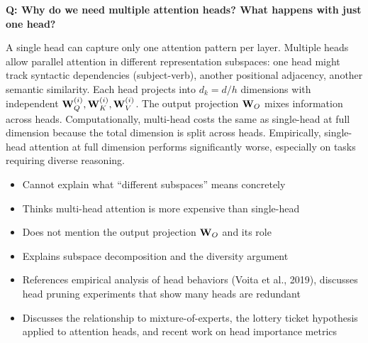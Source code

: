 \begin{interviewq}
\textbf{Q: Why do we need multiple attention heads? What happens with just one head?}

 \quad {} \quad \badgefreq{\freqhigh}

\stronganswer
A single head can capture only one attention pattern per layer.  Multiple heads
allow parallel attention in different representation subspaces: one head might
track syntactic dependencies (subject-verb), another positional adjacency,
another semantic similarity.  Each head projects into $d_k = d/h$ dimensions
with independent $\mathbf{W}_Q^{(i)}, \mathbf{W}_K^{(i)}, \mathbf{W}_V^{(i)}$.  The output
projection $\mathbf{W}_O$ mixes information across heads.  Computationally, multi-head
costs the same as single-head at full dimension because the total dimension is
split across heads.  Empirically, single-head attention at full dimension
performs significantly worse, especially on tasks requiring diverse reasoning.

\redflags
\begin{itemize}
    \item Cannot explain what ``different subspaces'' means concretely
    \item Thinks multi-head attention is more expensive than single-head
    \item Does not mention the output projection $\mathbf{W}_O$ and its role
\end{itemize}


\goodgreat
\begin{itemize}
    \item {} Explains subspace decomposition and the diversity argument
    \item {} References empirical analysis of head behaviors (Voita et al.,
          2019), discusses head pruning experiments that show many heads are redundant
    \item {} Discusses the relationship to mixture-of-experts, the
          lottery ticket hypothesis applied to attention heads, and recent work on
          head importance metrics
\end{itemize}

\end{interviewq}

